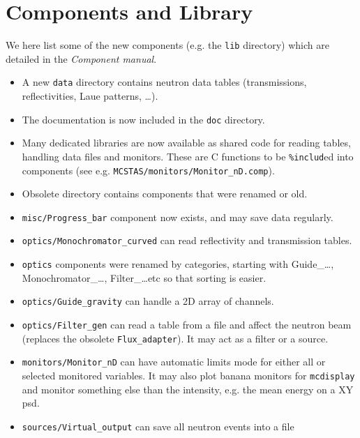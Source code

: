 \section{Components and Library} 
\label{s:new-features:components}
 
  
  We here list some of the new components (e.g. the \MCS \verb+lib+ directory) which are detailed in the {\it Component manual}.
  
\begin{itemize}
\item A new \verb+data+ directory contains neutron data tables (transmissions, reflectivities, Laue patterns, \ldots).
\item The documentation is now included in the \verb+doc+ directory.
\item Many dedicated libraries are now available as shared code for reading tables,
    handling data files and monitors. These are C functions to be \texttt{\%includ}ed
    into components (see e.g. \verb+MCSTAS/monitors/Monitor_nD.comp+).
\item Obsolete directory contains components that were renamed or old.
\item \verb+misc/Progress_bar+ component now exists, and may save data regularly.
\item \verb+optics/Monochromator_curved+ can read reflectivity and transmission tables.
\item \verb+optics+ components were renamed by categories, starting with
   Guide\_\ldots, Monochromator\_\ldots, Filter\_\ldots etc so that sorting is
   easier. 
\item \verb+optics/Guide_gravity+ can handle a 2D array of channels.
\item \verb+optics/Filter_gen+ can read a table from a file and affect the neutron
    beam (replaces the obsolete \verb+Flux_adapter+). It may act as a filter or a
    source.
\item \verb+monitors/Monitor_nD+ can have automatic limits mode for either all or 
    selected monitored variables. It may also plot banana monitors for
    \verb+mcdisplay+ and monitor something else than the intensity, e.g. the mean
    energy on a XY psd. 
\item \verb+sources/Virtual_output+ can save all neutron events into a file

\end{itemize}
